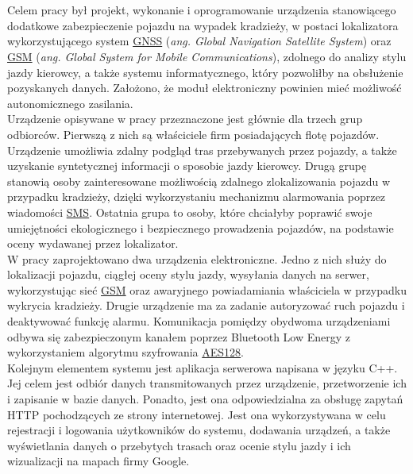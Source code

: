 \thispagestyle{empty}
\\

\\

\begin{singlespacing}

Celem pracy był projekt, wykonanie i oprogramowanie urządzenia stanowiącego dodatkowe zabezpieczenie pojazdu na wypadek kradzieży, w postaci lokalizatora wykorzystującego system \underline{GNSS} (\textit{ang. Global Navigation Satellite System}) oraz \underline{GSM} (\textit{ang. Global System for Mobile Communications}), zdolnego do analizy stylu jazdy kierowcy, a także systemu informatycznego, który pozwoliłby na obsłużenie pozyskanych danych. Założono, że moduł elektroniczny powinien mieć możliwość autonomicznego zasilania.\\

Urządzenie opisywane w pracy przeznaczone jest głównie dla trzech grup odbiorców. Pierwszą z nich są właściciele firm posiadających flotę pojazdów. Urządzenie umożliwia zdalny podgląd tras przebywanych przez pojazdy, a także uzyskanie syntetycznej informacji o sposobie jazdy kierowcy. Drugą grupę stanowią osoby zainteresowane możliwością zdalnego zlokalizowania pojazdu w przypadku kradzieży, dzięki wykorzystaniu mechanizmu alarmowania poprzez wiadomości \underline{SMS}. Ostatnia grupa to osoby, które chciałyby poprawić swoje umiejętności ekologicznego i bezpiecznego prowadzenia pojazdów, na podstawie oceny wydawanej przez lokalizator. \\

W pracy zaprojektowano dwa urządzenia elektroniczne. Jedno z nich służy do lokalizacji pojazdu, ciągłej oceny stylu jazdy, wysyłania danych na serwer, wykorzystując sieć \underline{GSM} oraz awaryjnego powiadamiania właściciela w przypadku wykrycia kradzieży. Drugie urządzenie ma za zadanie autoryzować ruch pojazdu i deaktywować funkcję alarmu. Komunikacja pomiędzy obydwoma urządzeniami odbywa się zabezpieczonym kanałem poprzez Bluetooth Low Energy z wykorzystaniem algorytmu szyfrowania \underline{AES128}. \\

Kolejnym elementem systemu jest aplikacja serwerowa napisana w języku C++. Jej celem jest odbiór danych transmitowanych przez urządzenie, przetworzenie ich i zapisanie w bazie danych. Ponadto, jest ona odpowiedzialna za obsługę zapytań HTTP pochodzących ze strony internetowej. Jest ona wykorzystywana w celu rejestracji i logowania użytkowników do systemu, dodawania urządzeń, a także wyświetlania danych o przebytych trasach oraz ocenie stylu jazdy i ich wizualizacji na mapach firmy Google. \\


\end{singlespacing}
